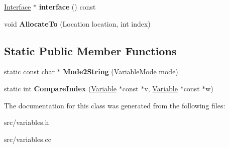 \begin{DoxyCompactItemize}
\item 
\hypertarget{classv8_1_1internal_1_1_variable_a4fa998362914f6b7ffc3829a75fa7ba2}{}\hyperlink{classv8_1_1internal_1_1_interface}{Interface} $\ast$ {\bfseries interface} () const \label{classv8_1_1internal_1_1_variable_a4fa998362914f6b7ffc3829a75fa7ba2}

\item 
\hypertarget{classv8_1_1internal_1_1_variable_a63f856871612e8cf37e7285dd3d934d7}{}void {\bfseries Allocate\+To} (Location location, int index)\label{classv8_1_1internal_1_1_variable_a63f856871612e8cf37e7285dd3d934d7}

\end{DoxyCompactItemize}
\subsection*{Static Public Member Functions}
\begin{DoxyCompactItemize}
\item 
\hypertarget{classv8_1_1internal_1_1_variable_a0750ffbed760edd621661223d0c1ac12}{}static const char $\ast$ {\bfseries Mode2\+String} (Variable\+Mode mode)\label{classv8_1_1internal_1_1_variable_a0750ffbed760edd621661223d0c1ac12}

\item 
\hypertarget{classv8_1_1internal_1_1_variable_aefe29b283ce5a634b217028445caf95c}{}static int {\bfseries Compare\+Index} (\hyperlink{classv8_1_1internal_1_1_variable}{Variable} $\ast$const $\ast$v, \hyperlink{classv8_1_1internal_1_1_variable}{Variable} $\ast$const $\ast$w)\label{classv8_1_1internal_1_1_variable_aefe29b283ce5a634b217028445caf95c}

\end{DoxyCompactItemize}


The documentation for this class was generated from the following files\+:\begin{DoxyCompactItemize}
\item 
src/variables.\+h\item 
src/variables.\+cc\end{DoxyCompactItemize}
